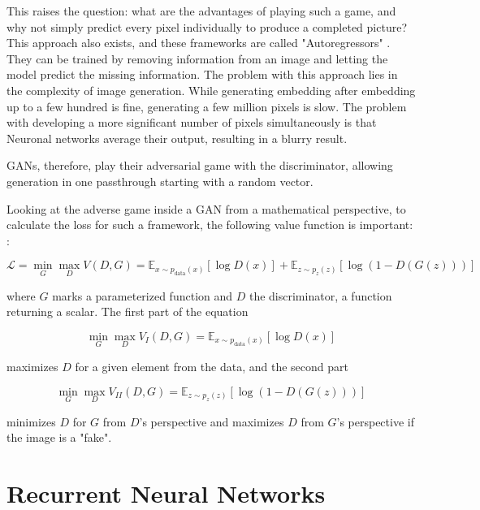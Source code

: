 This raises the question: what are the advantages of playing such a game, and why not simply predict every pixel individually to produce a completed picture? This approach also exists, and these frameworks are called "Autoregressors" \cite{oord2016pixelrecurrentneuralnetworks}. They can be trained by removing information from an image and letting the model predict the missing information. The problem with this approach lies in the complexity of image generation. While generating embedding after embedding up to a few hundred is fine, generating a few million pixels is slow. The problem with developing a more significant number of pixels simultaneously is that Neuronal networks average their output, resulting in a blurry result. 

GANs, therefore, play their adversarial game with the discriminator, allowing generation in one passthrough starting with a random vector.

Looking at the adverse game inside a GAN from a mathematical perspective, to calculate the loss for such a framework, the following value function is important: \cite{goodfellow2014generativeadversarialnetworks}:

\begin{equation}
\label{eq:minimaxgame-definition}
\mathcal{L} = \min_G \max_D V(D, G) = \mathbb{E}_{x \sim p_{\text{data}}(x)}[\log D(x)] + \mathbb{E}_{z \sim p_{z}(z)}[\log (1 - D(G(z)))]
\end{equation}

where $G$ marks a parameterized function and $D$ the discriminator, a function returning a scalar. The first part of the equation

\begin{equation}
\min_G \max_D V_I(D, G) = \mathbb{E}_{x \sim p_{\text{data}}(x)}[\log D(x)]
\end{equation}

maximizes $D$ for a given element from the data, and the second part

\begin{equation}
\min_G \max_D V_{II}(D, G) = \mathbb{E}_{z \sim p_{z}(z)}[\log (1 - D(G(z)))]
\end{equation}

minimizes $D$ for $G$ from $D$'s perspective and maximizes $D$ from $G$'s perspective if the image is a "fake". 


\section{Recurrent Neural Networks}

